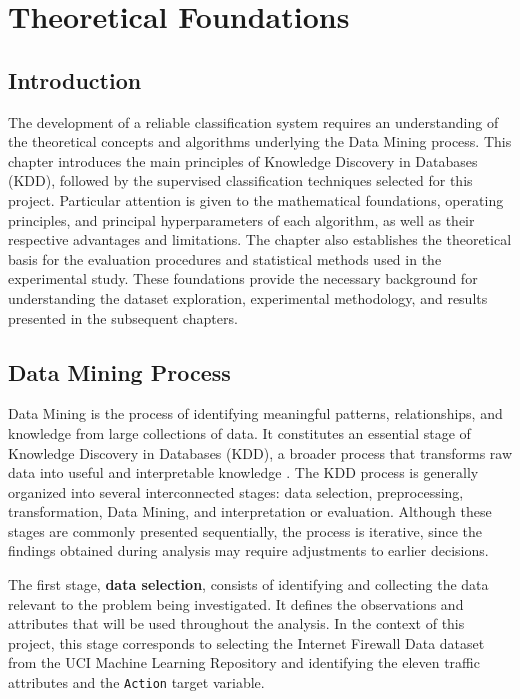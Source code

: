 
\chapter{Theoretical Foundations}
\label{chap:fondements}

\section{Introduction}

The development of a reliable classification system requires an understanding of the theoretical concepts and algorithms underlying the Data Mining process. This chapter introduces the main principles of Knowledge Discovery in Databases (KDD), followed by the supervised classification techniques selected for this project. Particular attention is given to the mathematical foundations, operating principles, and principal hyperparameters of each algorithm, as well as their respective advantages and limitations. The chapter also establishes the theoretical basis for the evaluation procedures and statistical methods used in the experimental study. These foundations provide the necessary background for understanding the dataset exploration, experimental methodology, and results presented in the subsequent chapters.

\section{Data Mining Process}

Data Mining is the process of identifying meaningful patterns, relationships, and knowledge from large collections of data. It constitutes an essential stage of Knowledge Discovery in Databases (KDD), a broader process that transforms raw data into useful and interpretable knowledge \cite{fayyad1996data}. The KDD process is generally organized into several interconnected stages: data selection, preprocessing, transformation, Data Mining, and interpretation or evaluation. Although these stages are commonly presented sequentially, the process is iterative, since the findings obtained during analysis may require adjustments to earlier decisions.

The first stage, \textbf{data selection}, consists of identifying and collecting the data relevant to the problem being investigated. It defines the observations and attributes that will be used throughout the analysis. In the context of this project, this stage corresponds to selecting the Internet Firewall Data dataset from the UCI Machine Learning Repository and identifying the eleven traffic attributes and the \texttt{Action} target variable.

